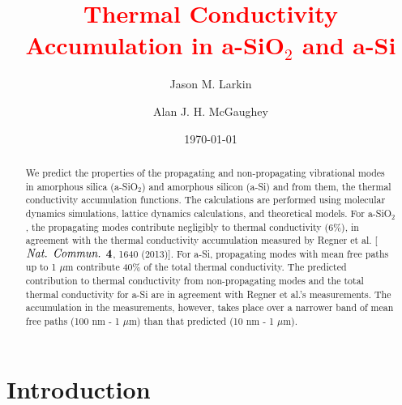 \documentclass[aps,prb,onecolumn,preprint,superscriptaddress,footinbib,amsmath,amssymb,floatfix]{revtex4}
\begin{document}
\title{\textcolor{red}{Thermal Conductivity 
Accumulation in a-SiO$_2$ and a-Si}}
\author{Jason M. Larkin}
\author{Alan J. H. McGaughey}

\date{\today}
\begin{abstract}
We predict the properties of the propagating and non-propagating 
vibrational modes in amorphous silica (a-SiO$_2$) and amorphous silicon 
(a-Si) and from them, the thermal conductivity accumulation functions. 
The calculations are performed using molecular dynamics simulations, 
lattice dynamics calculations, and theoretical models. For a-SiO$_2$, 
the propagating modes contribute negligibly to thermal conductivity 
(6$\%$), in 
agreement with the thermal conductivity accumulation measured by 
Regner et al. [$\emph{Nat. Commun.}$ $\bf{4}$, 1640 (2013)]. 
For a-Si, propagating modes 
with mean free paths up to 1 $\mu$m contribute 40$\%$ of the total 
thermal 
conductivity. The predicted contribution to thermal conductivity from 
non-propagating modes and the total thermal conductivity for a-Si are in 
agreement with Regner et al.'s measurements. The accumulation in the 
measurements, however, takes place over a narrower band of 
mean free paths (100 nm - 1 $\mu$m) than that predicted 
(10 nm - 1 $\mu$m).
\end{abstract}
\maketitle
\section{\label{S:Introduction}Introduction}
\end{document}
